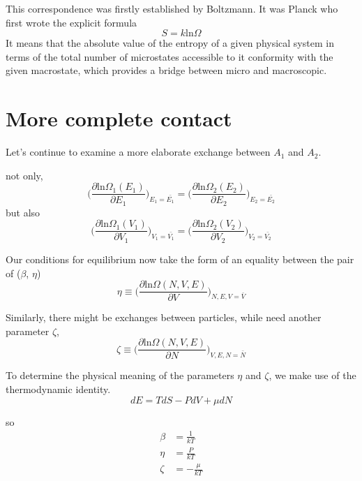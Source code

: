 This correspondence was firstly established by Boltzmann. It was Planck who first wrote the explicit formula
\begin{equation}
	S = k\textrm{ln}\Omega
\end{equation}
It means that the absolute value of the entropy of a given physical system in terms of the total number of microstates accessible to it conformity with the given macrostate, which provides a bridge between micro and macroscopic.


\section{More complete contact}
Let's continue to examine a more elaborate exchange between $A_1$ and $A_2$.

not only,
\begin{equation} 
	\bigg(\frac{\partial {\textrm{ln} \Omega_1(E_1)}} {\partial {E_1}}\bigg) _{E_1=\bar{E_1}} =
	\bigg(\frac{\partial {\textrm{ln} \Omega_2(E_2)}} {\partial {E_2}}\bigg) _{E_2=\bar{E_2}}
\end{equation}
but also
\begin{equation} 
	\bigg(\frac{\partial {\textrm{ln} \Omega_1(V_1)}} {\partial {V_1}}\bigg) _{V_1=\bar{V_1}} =
	\bigg(\frac{\partial {\textrm{ln} \Omega_2(V_2)}} {\partial {V_2}}\bigg) _{V_2=\bar{V_2}}
\end{equation}

Our conditions for equilibrium now take the form of an equality between the pair of ($\beta$, $\eta$)
\begin{equation} 
	\eta \equiv \bigg(\frac{\partial {\textrm{ln} \Omega(N,V,E)}} {\partial {V}}\bigg) _{N,E,V=\bar{V}}
\end{equation}

Similarly, there might be exchanges between particles, while need another parameter $\zeta$,
\begin{equation} 
	\zeta \equiv \bigg(\frac{\partial {\textrm{ln} \Omega(N,V,E)}} {\partial {N}}\bigg) _{V,E,N=\bar{N}}
\end{equation}

To determine the physical meaning of the parameters $\eta$ and $\zeta$, we make use of the thermodynamic identity.
\begin{equation} 
	dE = TdS - PdV + \mu dN
\end{equation}

so
\begin{equation} 
	\begin{split}
	\beta &= \frac{1}{kT} \\
	\eta  &= \frac{P}{kT} \\
	\zeta &= -\frac{\mu}{kT}
	\end{split}
\end{equation}

